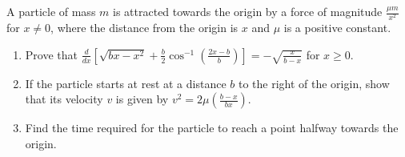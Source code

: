 \newpage

\begin{problem}
A particle of mass $m$ is attracted towards the origin by a force of magnitude $\frac{\mu m}{x^2}$ for $x \neq 0$, where the distance from the origin is $x$ and $\mu$ is a positive constant.

\begin{enumerate}[label=\textbf{\roman*.}]
    \item Prove that $\displaystyle \frac{d}{dx}\left[\sqrt{bx - x^2} + \frac{b}{2}\cos^{-1}\left(\frac{2x-b}{b}\right)\right] = -\sqrt{\frac{x}{b-x}}$ for $x \ge 0$.
    \item If the particle starts at rest at a distance $b$ to the right of the origin, show that its velocity $v$ is given by $\displaystyle v^2 = 2\mu \left(\frac{b-x}{bx}\right)$.
    \item Find the time required for the particle to reach a point halfway towards the origin.
\end{enumerate}
\end{problem}

